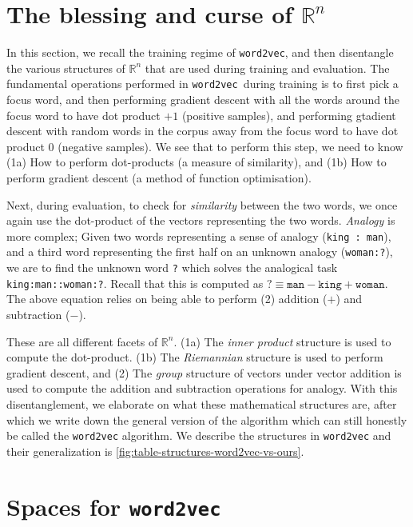\documentclass[11pt]{book}
\newcommand{\wtov}{\texttt{word2vec }}
\newcommand{\R}{\ensuremath{\mathbb R}}
\begin{document}
\section{The blessing and curse of $\mathbb{R}^n$}

In this section, we recall the training regime of \texttt{word2vec},
and then disentangle the various structures of $\mathbb{R}^n$ that are
used during training and evaluation. The fundamental operations performed in
\wtov during training is to first pick a focus word, and then performing gradient descent
with all the words around the focus word to have dot product $+1$ (positive samples),
and performing gtadient descent with random words in the corpus away from the focus word
to have dot product $0$ (negative samples). We see that to perform this step,
we need to know (1a) How to perform dot-products (a measure of similarity), and (1b)
How to perform gradient descent (a method of function optimisation).

Next, during evaluation, to check for \emph{similarity} between the two words,
we once again use the dot-product of the vectors representing the two words.
\emph{Analogy} is more complex;
Given two words representing a sense of analogy (\texttt{king : man}), and a third
word representing the first half on an unknown analogy (\texttt{woman:?}), we 
are to find the unknown word \texttt{?} which solves the analogical task
\texttt{king:man::woman:?}. Recall that this is computed as $? \equiv \texttt{man} - \texttt{king} + \texttt{woman}$.
The above equation relies on being able to perform (2) addition ($+$) and subtraction ($-$).


These are all different facets of $\R^n$. (1a) The \emph{inner product}
structure is used to compute the dot-product. (1b) The \emph{Riemannian} structure is used to perform
gradient descent, and (2) The \emph{group} structure of vectors under vector addition is used to compute
the addition and subtraction operations for analogy. With this disentanglement, we elaborate
on what these mathematical structures are, after which we write down the
general version of the algorithm which can still honestly be called the
\texttt{word2vec} algorithm. We describe the structures in \texttt{word2vec}
and their generalization is \autoref{fig:table-structures-word2vec-vs-ours}.



\section{Spaces for \wtov}
\end{document}
